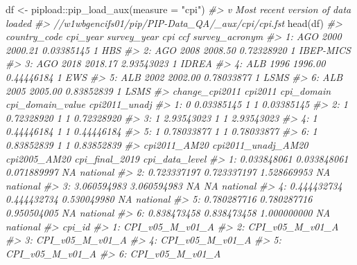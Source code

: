 \documentclass[
]{book}
\newenvironment{Shaded}{\begin{snugshade}}{\end{snugshade}}
\newcommand{\AttributeTok}[1]{\textcolor[rgb]{0.77,0.63,0.00}{#1}}
\newcommand{\CommentTok}[1]{\textcolor[rgb]{0.56,0.35,0.01}{\textit{#1}}}
\newcommand{\FunctionTok}[1]{\textcolor[rgb]{0.00,0.00,0.00}{#1}}
\newcommand{\NormalTok}[1]{#1}
\newcommand{\OtherTok}[1]{\textcolor[rgb]{0.56,0.35,0.01}{#1}}
\newcommand{\SpecialCharTok}[1]{\textcolor[rgb]{0.00,0.00,0.00}{#1}}
\newcommand{\StringTok}[1]{\textcolor[rgb]{0.31,0.60,0.02}{#1}}
\begin{document}
\begin{Shaded}
\begin{Highlighting}[]
\NormalTok{df }\OtherTok{\textless{}{-}}\NormalTok{ pipload}\SpecialCharTok{::}\FunctionTok{pip\_load\_aux}\NormalTok{(}\AttributeTok{measure =} \StringTok{"cpi"}\NormalTok{)}
\CommentTok{\#\textgreater{} v Most recent version of data loaded}
\CommentTok{\#\textgreater{} \textquotesingle{}//w1wbgencifs01/pip/PIP{-}Data\_QA/\_aux/cpi/cpi.fst\textquotesingle{}}
\FunctionTok{head}\NormalTok{(df)}
\CommentTok{\#\textgreater{}    country\_code cpi\_year survey\_year        cpi ccf survey\_acronym}
\CommentTok{\#\textgreater{} 1:          AGO     2000     2000.21 0.03385145   1            HBS}
\CommentTok{\#\textgreater{} 2:          AGO     2008     2008.50 0.72328920   1      IBEP{-}MICS}
\CommentTok{\#\textgreater{} 3:          AGO     2018     2018.17 2.93543023   1          IDREA}
\CommentTok{\#\textgreater{} 4:          ALB     1996     1996.00 0.44446184   1            EWS}
\CommentTok{\#\textgreater{} 5:          ALB     2002     2002.00 0.78033877   1           LSMS}
\CommentTok{\#\textgreater{} 6:          ALB     2005     2005.00 0.83852839   1           LSMS}
\CommentTok{\#\textgreater{}    change\_cpi2011    cpi2011 cpi\_domain cpi\_domain\_value cpi2011\_unadj}
\CommentTok{\#\textgreater{} 1:              0 0.03385145          1                1    0.03385145}
\CommentTok{\#\textgreater{} 2:              1 0.72328920          1                1    0.72328920}
\CommentTok{\#\textgreater{} 3:              1 2.93543023          1                1    2.93543023}
\CommentTok{\#\textgreater{} 4:              1 0.44446184          1                1    0.44446184}
\CommentTok{\#\textgreater{} 5:              1 0.78033877          1                1    0.78033877}
\CommentTok{\#\textgreater{} 6:              1 0.83852839          1                1    0.83852839}
\CommentTok{\#\textgreater{}    cpi2011\_AM20 cpi2011\_unadj\_AM20 cpi2005\_AM20 cpi\_final\_2019 cpi\_data\_level}
\CommentTok{\#\textgreater{} 1:  0.033848061        0.033848061  0.071889997             NA       national}
\CommentTok{\#\textgreater{} 2:  0.723337197        0.723337197  1.528669953             NA       national}
\CommentTok{\#\textgreater{} 3:  3.060594983        3.060594983           NA             NA       national}
\CommentTok{\#\textgreater{} 4:  0.444432734        0.444432734  0.530049980             NA       national}
\CommentTok{\#\textgreater{} 5:  0.780287716        0.780287716  0.950504005             NA       national}
\CommentTok{\#\textgreater{} 6:  0.838473458        0.838473458  1.000000000             NA       national}
\CommentTok{\#\textgreater{}             cpi\_id}
\CommentTok{\#\textgreater{} 1: CPI\_v05\_M\_v01\_A}
\CommentTok{\#\textgreater{} 2: CPI\_v05\_M\_v01\_A}
\CommentTok{\#\textgreater{} 3: CPI\_v05\_M\_v01\_A}
\CommentTok{\#\textgreater{} 4: CPI\_v05\_M\_v01\_A}
\CommentTok{\#\textgreater{} 5: CPI\_v05\_M\_v01\_A}
\CommentTok{\#\textgreater{} 6: CPI\_v05\_M\_v01\_A}
\end{Highlighting}
\end{Shaded}
\end{document}
